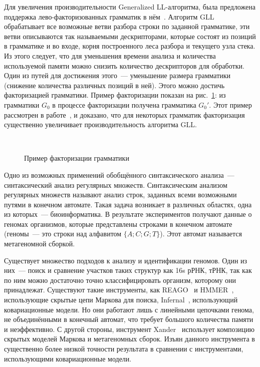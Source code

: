 Для увеличения производительности Generalized LL-алгоритма, была предложена поддержка 
лево-факторизованных грамматик в нём~\cite{scott2016structuring}.
Алгоритм GLL обрабатывает все возможные ветви разбора строки по заданной грамматике, 
эти ветви описываются так называемыми дескрипторами, которые состоят из позиций в грамматике и во входе,
корня построенного леса разбора и текущего узла стека. Из этого следует, что для уменьшения времени анализа и количества используемой памяти
можно снизить количество дескрипторов для обработки. Один из путей для достижения этого~--- 
уменьшение размера грамматики (снижение количества различных позиций в ней).
Этого можно достичь факторизацией грамматики. Пример факторизации показан на рис.~\ref{fig:ExampleOfFactorization}:
из грамматики $G_0$ в процессе факторизации получена грамматика $G_0'$.
Этот пример рассмотрен в работе~\cite{scott2016structuring}, и доказано, что для некоторых грамматик факторизация 
существенно увеличивает производительность алгоритма GLL.
\begin{figure}
	\centering
	~
	\caption{Пример факторизации грамматики}
	\label{fig:ExampleOfFactorization}
\end{figure}

Одно из возможных применений обобщённого синтаксического анализа~--- синтаксический анализ регулярных множеств.
Синтаксическим анализом регулярных множеств называют анализ строк, заданных всеми возможными путями в конечном автомате.
Такая задача возникает в различных областях, одна из которых~--- биоинформатика. В результате экспериментов 
получают данные о геномах организмов, которые представлены строками в конечном автомате (геномы~--- это строки над алфавитом $\{A;C; G; T\}$).
Этот автомат называется метагеномной сборкой.

Существует множество подходов к анализу и идентификации геномов. Один из них~--- поиск и сравнение участков таких структур как
16s рРНК, тРНК, так как по ним можно достаточно точно классифицировать организм, которому они принадлежат.
Существуют такие инструменты, как REAGO~\cite{reago} и HMMER~\cite{hmmer}, использующие скрытые цепи Маркова для поиска, 
Infernal~\cite{Infernal}, использующий ковариационные модели. Но они работают лишь с линейными цепочками генома,
не объединёнными в конечный автомат, что требует большого количества памяти и неэффективно.
С другой стороны, инструмент Xander~\cite{xander} использует композицию скрытых моделей Маркова и метагеномных сборок.
Изъян данного инструмента в существенно более низкой точности результата в сравнении с инструментами, использующими ковариационные модели.

